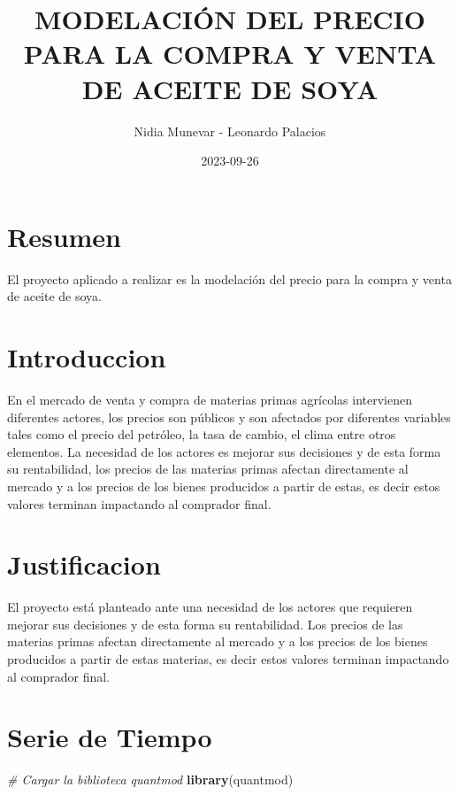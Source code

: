 \documentclass[
]{book}
\title{MODELACIÓN DEL PRECIO PARA LA COMPRA Y VENTA DE ACEITE DE SOYA}
\author{Nidia Munevar - Leonardo Palacios}
\date{2023-09-26}
\newenvironment{Shaded}{\begin{snugshade}}{\end{snugshade}}
\newcommand{\CommentTok}[1]{\textcolor[rgb]{0.56,0.35,0.01}{\textit{#1}}}
\newcommand{\FunctionTok}[1]{\textcolor[rgb]{0.13,0.29,0.53}{\textbf{#1}}}
\newcommand{\NormalTok}[1]{#1}
\begin{document}
\maketitle

{
\setcounter{tocdepth}{1}
\tableofcontents
}
\hypertarget{resumen}{%
\chapter{Resumen}\label{resumen}}

El proyecto aplicado a realizar es la modelación del precio para la compra y venta de aceite de soya.

\hypertarget{introduccion}{%
\chapter{Introduccion}\label{introduccion}}

En el mercado de venta y compra de materias primas agrícolas intervienen diferentes actores, los precios son públicos y son afectados por diferentes variables tales como el precio del petróleo, la tasa de cambio, el clima entre otros elementos. La necesidad de los actores es mejorar sus decisiones y de esta forma su rentabilidad, los precios de las materias primas afectan directamente al mercado y a los precios de los bienes producidos a partir de estas, es decir estos valores terminan impactando al comprador final.

\hypertarget{justificacion}{%
\chapter{Justificacion}\label{justificacion}}

El proyecto está planteado ante una necesidad de los actores que requieren mejorar sus decisiones y de esta forma su rentabilidad. Los precios de las materias primas afectan directamente al mercado y a los precios de los bienes producidos a partir de estas materias, es decir estos valores terminan impactando al comprador final.

\hypertarget{serie-de-tiempo}{%
\chapter{Serie de Tiempo}\label{serie-de-tiempo}}

\begin{Shaded}
\begin{Highlighting}[]
\CommentTok{\# Cargar la biblioteca quantmod}
\FunctionTok{library}\NormalTok{(quantmod)}
\end{Highlighting}
\end{Shaded}
\end{document}
